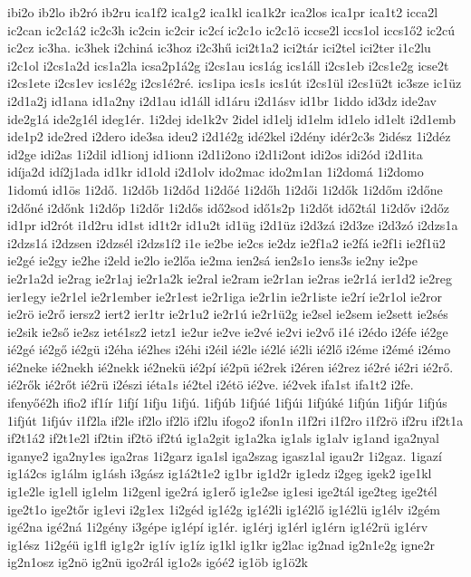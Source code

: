 {ibi2o
ib2lo
ib2ró
ib2ru
ica1f2
ica1g2
ica1kl
ica1k2r
ica2los
ica1pr
ica1t2
icca2l
ic2can
ic2c1á2
ic2c3h
ic2cin
ic2cir
ic2cí
ic2c1o
ic2c1ö
iccse2l
iccs1ol
iccs1ő2
ic2cú
ic2cz
ic3ha.
ic3hek
i2chiná
ic3hoz
i2c3hű
ici2t1a2
ici2tár
ici2tel
ici2ter
i1c2lu
i2c1ol
i2cs1a2d
ics1a2la
icsa2p1á2g
i2cs1au
ics1ág
ics1áll
i2cs1eb
i2cs1e2g
icse2t
i2cs1ete
i2cs1ev
ics1é2g
i2cs1é2ré.
ics1ipa
ics1s
ics1út
i2cs1ül
i2cs1ü2t
ic3sze
ic1üz
i2d1a2j
id1ana
id1a2ny
i2d1au
id1áll
id1áru
i2d1ásv
id1br
1iddo
id3dz
ide2av
ide2g1á
ide2g1él
ideg1ér.
1i2dej
ide1k2v
2idel
id1elj
id1elm
id1elo
id1elt
i2d1emb
ide1p2
ide2red
i2dero
ide3sa
ideu2
i2d1é2g
idé2kel
i2dény
idér2c3s
2idész
1i2déz
id2ge
idi2as
1i2dil
id1ionj
id1ionn
i2d1i2ono
i2d1i2ont
idi2os
idi2ód
i2d1ita
idíja2d
idí2j1ada
id1kr
id1old
i2d1olv
ido2mac
ido2m1an
1i2domá
1i2domo
1idomú
id1ös
1i2dő.
1i2dőb
1i2dőd
1i2dőé
1i2dőh
1i2dői
1i2dők
1i2dőm
i2dőne
i2dőné
i2dőnk
1i2dőp
1i2dőr
1i2dős
idő2sod
idő1s2p
1i2dőt
idő2tál
1i2dőv
i2dőz
id1pr
id2rót
i1d2ru
id1st
id1t2r
id1u2t
id1üg
i2d1üz
i2d3zá
i2d3ze
i2d3zó
i2dzs1a
i2dzs1á
i2dzsen
i2dzsél
i2dzs1í2
i1e
ie2be
ie2cs
ie2dz
ie2f1a2
ie2fá
ie2f1i
ie2f1ü2
ie2gé
ie2gy
ie2he
i2eld
ie2lo
ie2lőa
ie2ma
ien2sá
ien2s1o
iens3s
ie2ny
ie2pe
ie2r1a2d
ie2rag
ie2r1aj
ie2r1a2k
ie2ral
ie2ram
ie2r1an
ie2ras
ie2r1á
ier1d2
ie2reg
ier1egy
ie2r1el
ie2r1ember
ie2r1est
ie2r1iga
ie2r1in
ie2r1iste
ie2rí
ie2r1ol
ie2ror
ie2rö
ie2rő
iersz2
iert2
ier1tr
ie2r1u2
ie2r1ú
ie2r1ü2g
ie2sel
ie2sem
ie2sett
ie2sés
ie2sik
ie2ső
ie2sz
ieté1sz2
ietz1
ie2ur
ie2ve
ie2vé
ie2vi
ie2vő
i1é
i2édo
i2éfe
ié2ge
ié2gé
ié2gő
ié2gü
i2éha
ié2hes
i2éhi
i2éil
ié2le
ié2lé
ié2li
ié2lő
i2éme
i2émé
i2émo
ié2neke
ié2nekh
ié2nekk
ié2nekü
ié2pí
ié2pü
ié2rek
i2éren
ié2rez
ié2ré
ié2ri
ié2rő.
ié2rők
ié2rőt
ié2rü
i2észi
iéta1s
ié2tel
i2étö
ié2ve.
ié2vek
ifa1st
ifa1t2
i2fe.
ifenyőé2h
ifio2
if1ír
1ifjí
1ifju
1ifjú.
1ifjúb
1ifjúé
1ifjúi
1ifjúké
1ifjún
1ifjúr
1ifjús
1ifjút
1ifjúv
i1f2la
if2le
if2lo
if2lö
if2lu
ifogo2
ifon1n
i1f2ri
i1f2ro
i1f2rö
if2ru
if2t1a
if2t1á2
if2t1e2l
if2tin
if2tö
if2tú
ig1a2git
ig1a2ka
ig1als
ig1alv
ig1and
iga2nyal
iganye2
iga2ny1es
iga2ras
1i2garz
iga1sl
iga2szag
igasz1al
igau2r
1i2gaz.
1igazí
ig1á2cs
ig1álm
ig1ásh
i3gász
ig1á2t1e2
ig1br
ig1d2r
ig1edz
i2geg
igek2
ige1kl
ig1e2le
ig1ell
ig1elm
1i2genl
ige2rá
ig1erő
ig1e2se
ig1esi
ige2tál
ige2teg
ige2tél
ige2t1o
ige2tőr
ig1evi
i2g1ex
1i2géd
ig1é2g
ig1é2li
ig1é2lő
ig1é2lü
ig1élv
i2gém
igé2na
igé2ná
1i2gény
i3gépe
ig1épí
ig1ér.
ig1érj
ig1érl
ig1érn
ig1é2rü
ig1érv
ig1ész
1i2géü
ig1fl
ig1g2r
ig1ív
ig1íz
ig1kl
ig1kr
ig2lac
ig2nad
ig2n1e2g
igne2r
ig2n1osz
ig2nö
ig2nü
igo2rál
ig1o2s
igóé2
ig1öb
ig1ö2k
}
